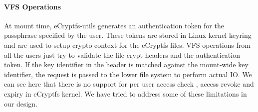 \paragraph{VFS Operations}
At mount time, eCryptfs-utils generates an authentication token for
the passphrase specified by the user.  These tokens are stored in
Linux kernel keyring and are used to setup crypto context for the
eCryptfs files.  VFS operations from all the users just try to
validate the file crypt headers and the authentication token.  If the
key identifier in the header is matched against the mount-wide key
identifier, the request is passed to the lower file system to perform
actual IO.  We can see here that there is no support for per user
access check , access revoke and expiry in eCryptfs kernel.  We have
tried to address some of these limitations in our design.

